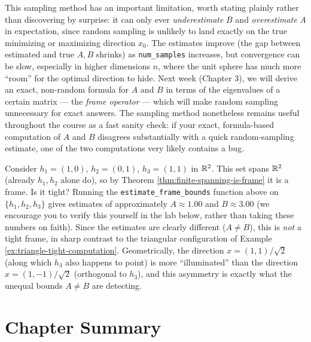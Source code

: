 \begin{remark*}
This sampling method has an important limitation, worth stating plainly rather than discovering by surprise: it can only ever \emph{underestimate} $B$ and \emph{overestimate} $A$ in expectation, since random sampling is unlikely to land exactly on the true minimizing or maximizing direction $x_0$. The estimates improve (the gap between estimated and true $A, B$ shrinks) as \texttt{num\_samples} increases, but convergence can be slow, especially in higher dimensions $n$, where the unit sphere has much more ``room'' for the optimal direction to hide. Next week (Chapter 3), we will derive an exact, non-random formula for $A$ and $B$ in terms of the eigenvalues of a certain matrix --- the \emph{frame operator} --- which will make random sampling unnecessary for exact answers. The sampling method nonetheless remains useful throughout the course as a fast sanity check: if your exact, formula-based computation of $A$ and $B$ disagrees substantially with a quick random-sampling estimate, one of the two computations very likely contains a bug.
\end{remark*}

\begin{examplebox}[title={Example 2.6: A non-tight frame, numerically}]
\label{ex:non-tight-numerical}
Consider $h_1 = (1, 0)$, $h_2 = (0, 1)$, $h_3 = (1, 1)$ in $\mathbb{R}^2$. This set spans $\mathbb{R}^2$ (already $h_1, h_2$ alone do), so by Theorem \ref{thm:finite-spanning-is-frame} it is a frame. Is it tight? Running the \texttt{estimate\_frame\_bounds} function above on $\{h_1, h_2, h_3\}$ gives estimates of approximately $A \approx 1.00$ and $B \approx 3.00$ (we encourage you to verify this yourself in the lab below, rather than taking these numbers on faith). Since the estimates are clearly different ($A \ne B$), this is \emph{not} a tight frame, in sharp contrast to the triangular configuration of Example \ref{ex:triangle-tight-computation}. Geometrically, the direction $x = (1,1)/\sqrt2$ (along which $h_3$ also happens to point) is more ``illuminated'' than the direction $x = (1,-1)/\sqrt2$ (orthogonal to $h_3$), and this asymmetry is exactly what the unequal bounds $A \ne B$ are detecting.
\end{examplebox}

\section{Chapter Summary}
\label{sec:summary-ch2}

